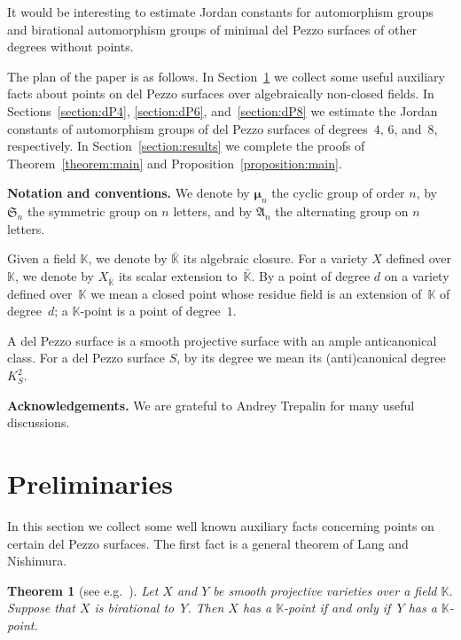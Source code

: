 \documentclass[12pt]{amsart}
\newcounter{cequation}[section]
\newtheorem{theorem}[cequation]{Theorem}
\theoremstyle{definition}
\theoremstyle{remark}
\newcommand{\KK}{\mathbb{K}}
\newcommand{\SSS}{\mathfrak{S}}
\newcommand{\AAA}{\mathfrak{A}}
\newcommand{\mumu}{{\boldsymbol{\mu}}}
\begin{document}
It would be interesting to estimate Jordan constants
for automorphism groups and birational automorphism groups of minimal del Pezzo surfaces
of other degrees without points.


\smallskip
The plan of the paper is as follows.
In Section~\ref{section:preliminaries} we collect some useful auxiliary facts
about points on del Pezzo surfaces over algebraically non-closed fields.
In Sections~\ref{section:dP4}, \ref{section:dP6}, and~\ref{section:dP8}
we estimate the Jordan constants of automorphism
groups of del Pezzo surfaces of degrees~$4$, $6$, and~$8$,
respectively. In Section~\ref{section:results} we
complete the proofs of Theorem~\ref{theorem:main}
and Proposition~\ref{proposition:main}.



\smallskip
\textbf{Notation and conventions.}
We denote by $\mumu_n$ the cyclic group of order $n$,
by $\SSS_n$ the symmetric group on $n$ letters,
and by $\AAA_n$ the alternating group on $n$ letters.

Given a field $\KK$, we denote by $\bar{\KK}$ its algebraic closure.
For a variety $X$ defined over $\KK$, we denote by $X_{\bar{\KK}}$
its scalar extension to~$\bar{\KK}$.
By a point of degree $d$ on a variety defined over~$\KK$ we mean a closed point whose
residue field is an extension of~$\KK$ of degree~$d$;
a $\KK$-point is a point of degree~$1$.

A del Pezzo surface is a smooth projective surface with an ample anticanonical class.
For a del Pezzo surface $S$, by its degree we mean its (anti)canonical degree~$K_S^2$.


\smallskip
\textbf{Acknowledgements.}
We are grateful to Andrey Trepalin for many useful discussions.


\section{Preliminaries}
\label{section:preliminaries}

In this section we collect some well known auxiliary facts
concerning points on certain del Pezzo surfaces. The first fact is a general
theorem of Lang and Nishimura.

\begin{theorem}[{see e.g.~\cite[Lemma~1.1]{VA}}]
\label{theorem:Lang-Nishimura}
Let $X$ and $Y$ be smooth projective varieties over a field $\KK$.
Suppose that $X$ is birational to~$Y$. Then $X$ has a $\KK$-point if and only if~$Y$ has a $\KK$-point.
\end{theorem}
\end{document}
